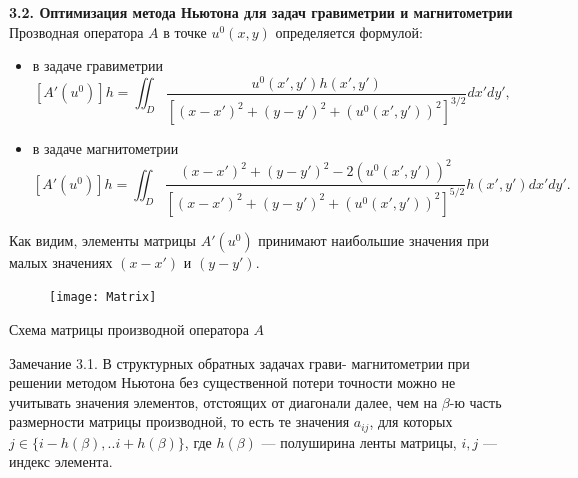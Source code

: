 \documentclass[10pt,pdf, mathserif, hyperref={unicode}]{beamer}
\begin{document}
\begin{frame}{\small\textbf{3.2. Оптимизация метода Ньютона для задач гравиметрии и магнитометрии}}
	Прозводная оператора $A$ в точке $u^0(x,y)$ определяется формулой:
	\begin{itemize}
		\item в задаче гравиметрии
		$$ [A'(u^0)]h=\iint_{D} \frac{u^0(x',y')h(x',y')}{[(x-x')^2+(y-y')^2+(u^0(x',y'))^2]^{3/2}}dx'dy',$$
		\item в задаче магнитометрии
		$$ [A'(u^0)]h=\iint_{D} \frac{(x-x')^2+(y-y')^2-2(u^0(x',y'))^2}{[(x-x')^2+(y-y')^2+(u^0(x',y'))^2]^{5/2}}h(x',y')dx'dy'.$$
	\end{itemize}
Как видим, элементы матрицы $A'(u^0)$ принимают наибольшие значения при малых значениях $(x-x')$ и $(y-y')$.
\begin{figure}
	\texttt{[image: Matrix]}
\end{figure}
\centering Схема матрицы производной оператора $A$
\end{frame}
\begin{frame}
	\begin{block}{Замечание 3.1.}
		В структурных обратных задачах грави- магнитометрии при решении методом Ньютона без существенной потери точности можно не учитывать значения элементов, отстоящих от диагонали далее, чем на  $\beta$-ю часть  размерности матрицы производной, то есть те значения $a_{ij}$, для которых  $j \in \{i-h(\beta),..i+h(\beta)\} $, где $h(\beta)$ --- полуширина ленты матрицы, $i, j$ --- индекс элемента.
	\end{block}
	\let\thefootnote\relax\let\thefootnote\relax{}
\end{frame}
\end{document}
